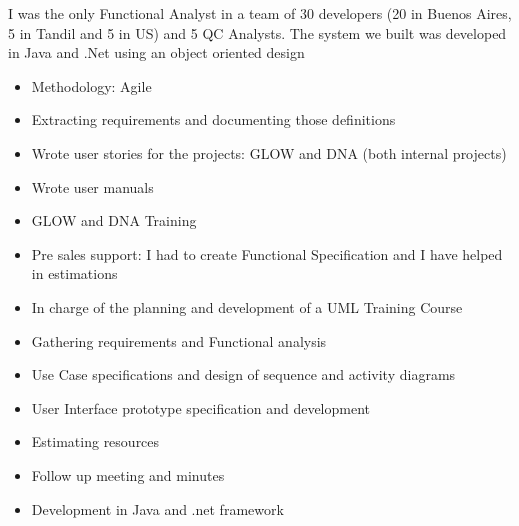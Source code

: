 \documentclass[11pt,a4paper,sans]{moderncv}
\begin{document}
I was the only Functional Analyst in a team of 30 developers (20 in Buenos Aires, 5 in Tandil and 5 in US) and 5 QC Analysts.
The system we built was developed in Java and .Net using an object oriented design

\begin{itemize}
  \item Methodology: Agile
  \item Extracting requirements and documenting those definitions
  \item Wrote user stories for the projects: GLOW and DNA (both internal projects)
  \item Wrote user manuals
  \item GLOW and DNA Training
  \item Pre sales support: I had to create Functional Specification and I have helped in estimations
  \item In charge of the planning and development of a UML Training Course
  \newline
  \newline
\end{itemize}



\begin{itemize}
  \item Gathering requirements and Functional analysis
  \item Use Case specifications and design of sequence and activity diagrams
  \item User Interface prototype specification and development
  \item Estimating resources
  \item Follow up meeting and minutes
  \item Development in Java and .net framework
  \newline
\end{itemize}
\end{document}
